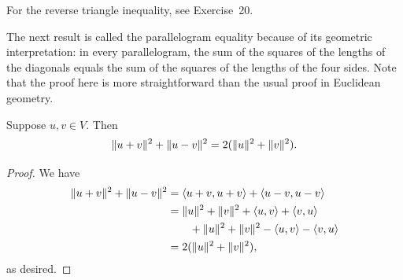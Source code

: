 For the reverse triangle inequality, see Exercise~20.

%
The next result is called the parallelogram equality because of its geometric
interpretation: in every parallelogram, the sum of the squares of the lengths
of the diagonals equals the sum of the squares of the lengths of the four
sides. Note that the proof here is more straightforward than the usual proof in
Euclidean geometry.

\begin{result}\label{ax:6.21}
Suppose $u,v\in V$. Then
\[ \lVert u+v \rVert^2+\lVert u-v \rVert^2 = 2(\lVert u \rVert^2+\lVert v \rVert^2). \]
\end{result}

\begin{proof}
We have
\begin{align*}
\lVert u+v \rVert^2+\lVert u-v \rVert^2 &= \langle u+v, u+v \rangle+\langle u-v, u-v \rangle\\
  &= \lVert u \rVert^2+\lVert v \rVert^2+\langle u, v \rangle+\langle v, u \rangle\\
  &\qquad+\lVert u \rVert^2+\lVert v \rVert^2-\langle u, v \rangle-\langle v, u \rangle\\
  &= 2(\lVert u \rVert^2+\lVert v \rVert^2),
\end{align*}
as desired.
\end{proof}

